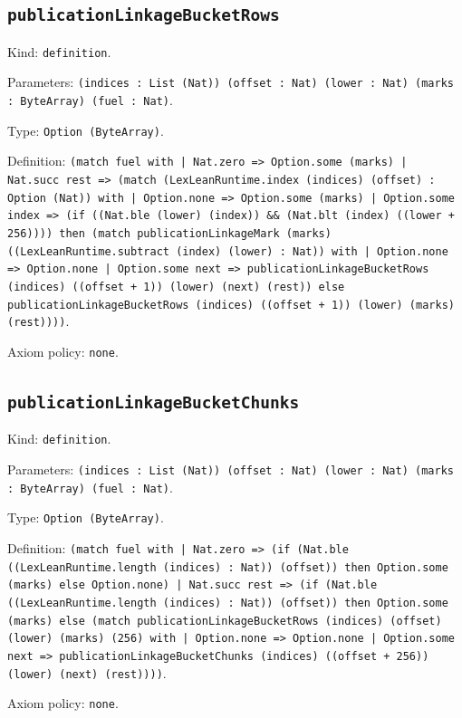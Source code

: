\documentclass[11pt]{article}
\begin{document}
\subsection*{\texttt{publicationLinkageBucketRows}}
\noindent Kind: \texttt{definition}.\par
\noindent Parameters: \texttt{(indices : List (Nat)) (offset : Nat) (lower : Nat) (marks : ByteArray) (fuel : Nat)}.\par
\noindent Type: \texttt{Option (ByteArray)}.\par
\noindent Definition: \texttt{(match fuel with | Nat.zero => Option.some (marks) | Nat.succ rest => (match (LexLeanRuntime.index (indices) (offset) : Option (Nat)) with | Option.none => Option.some (marks) | Option.some index => (if ((Nat.ble (lower) (index)) \&\& (Nat.blt (index) ((lower + 256)))) then (match publicationLinkageMark (marks) ((LexLeanRuntime.subtract (index) (lower) : Nat)) with | Option.none => Option.none | Option.some next => publicationLinkageBucketRows (indices) ((offset + 1)) (lower) (next) (rest)) else publicationLinkageBucketRows (indices) ((offset + 1)) (lower) (marks) (rest))))}.\par
\noindent Axiom policy: \texttt{none}.\par
\subsection*{\texttt{publicationLinkageBucketChunks}}
\noindent Kind: \texttt{definition}.\par
\noindent Parameters: \texttt{(indices : List (Nat)) (offset : Nat) (lower : Nat) (marks : ByteArray) (fuel : Nat)}.\par
\noindent Type: \texttt{Option (ByteArray)}.\par
\noindent Definition: \texttt{(match fuel with | Nat.zero => (if (Nat.ble ((LexLeanRuntime.length (indices) : Nat)) (offset)) then Option.some (marks) else Option.none) | Nat.succ rest => (if (Nat.ble ((LexLeanRuntime.length (indices) : Nat)) (offset)) then Option.some (marks) else (match publicationLinkageBucketRows (indices) (offset) (lower) (marks) (256) with | Option.none => Option.none | Option.some next => publicationLinkageBucketChunks (indices) ((offset + 256)) (lower) (next) (rest))))}.\par
\noindent Axiom policy: \texttt{none}.\par
\end{document}
